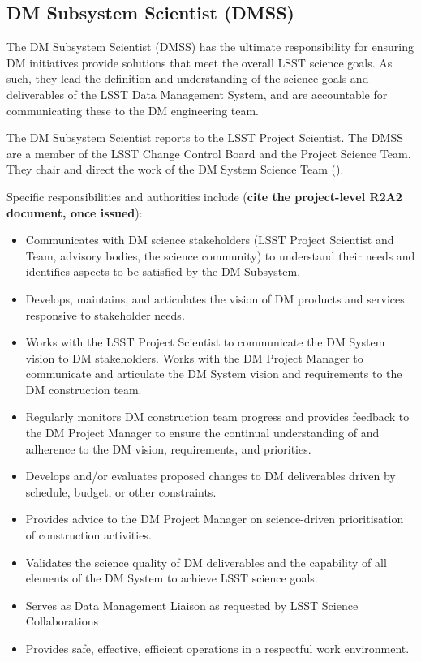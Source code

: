 \subsection{DM Subsystem Scientist (DMSS) \label{role:dmps} }

The DM Subsystem Scientist (DMSS) has the ultimate responsibility for ensuring DM initiatives provide solutions that meet the overall LSST science goals. As such, they lead the definition and understanding of the science goals and deliverables of the LSST Data Management System, and are accountable for communicating these to the DM engineering team.

The DM Subsystem Scientist reports to the LSST Project Scientist. The DMSS are a member of the LSST Change Control Board and the Project Science Team. They chair and direct the work of the DM System Science Team ().

Specific responsibilities and authorities include ({\bf cite the project-level R2A2 document, once issued}):


\begin{itemize}
\item Communicates with DM science stakeholders (LSST Project Scientist and Team, advisory bodies, the science community) to understand their needs and identifies aspects to be satisfied by the DM Subsystem.
\item Develops, maintains, and articulates the vision of DM products and services responsive to stakeholder needs.
\item Works with the LSST Project Scientist to communicate the DM System vision to DM stakeholders. Works with the DM Project Manager to communicate and articulate the DM System vision and requirements to the DM construction team.
\item Regularly monitors DM construction team progress and provides feedback to the DM Project Manager to ensure the continual understanding of and adherence to the DM vision, requirements, and priorities.
\item Develops and/or evaluates proposed changes to DM deliverables driven by schedule, budget, or other constraints.
\item Provides advice to the DM Project Manager on science-driven prioritisation of construction activities. 
\item Validates the science quality of DM deliverables and the capability of all elements of the DM System to achieve LSST science goals.
\item Serves as Data Management Liaison as requested by LSST Science Collaborations
\item Provides safe, effective, efficient operations in a respectful work environment.
\end{itemize}

